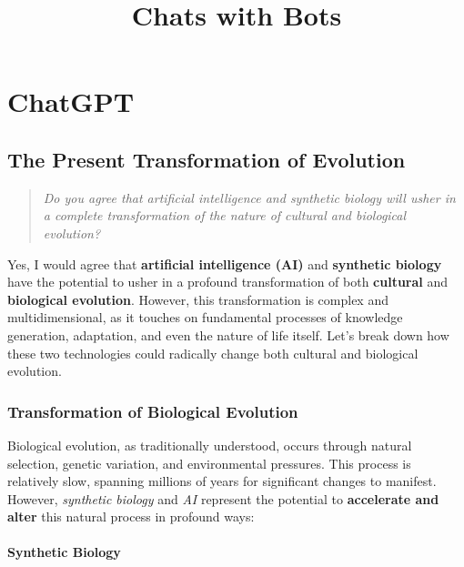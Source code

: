 \documentclass{book}
\title{\LARGE\bf Chats with Bots}
\author{}
\date{}
\begin{document}
\maketitle

\setcounter{tocdepth}{2}
{\parskip-0pt\tableofcontents}


\part{ChatGPT}

\chapter{The Present Transformation of Evolution}

\begin{quote}

\emph{Do you agree that artificial intelligence and synthetic biology will usher in a complete transformation of the nature of cultural and biological evolution?}

\end{quote}

Yes, I would agree that \textbf{artificial intelligence (AI)} and \textbf{synthetic biology} have the potential to usher in a profound transformation of both \textbf{cultural} and \textbf{biological evolution}. However, this transformation is complex and multidimensional, as it touches on fundamental processes of knowledge generation, adaptation, and even the nature of life itself. Let’s break down how these two technologies could radically change both cultural and biological evolution.

\section{Transformation of Biological Evolution}

Biological evolution, as traditionally understood, occurs through natural selection, genetic variation, and environmental pressures. This process is relatively slow, spanning millions of years for significant changes to manifest. However, \textit{synthetic biology} and \textit{AI} represent the potential to \textbf{accelerate and alter} this natural process in profound ways:

\subsection{Synthetic Biology}
\end{document}

